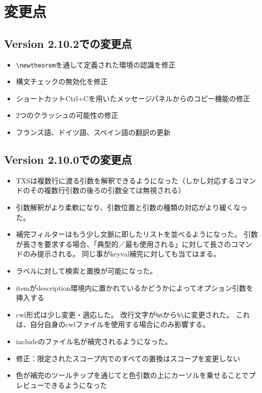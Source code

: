 \chapter{変更点}

\section{Version 2.10.2での変更点}

\begin{itemize}
    \item
      \verb+\newtheorem+を通して定義された環境の認識を修正
    \item
      構文チェックの無効化を修正
    \item
      ショートカットCtrl+Cを用いたメッセージパネルからのコピー機能の修正
    \item
      2つのクラッシュの可能性の修正
    \item
      フランス語、ドイツ語、スペイン語の翻訳の更新
\end{itemize}

\section{Version 2.10.0での変更点}

\begin{itemize}
    \item
      TXSは複数行に渡る引数を解釈できるようになった（しかし対応するコマンドのその複数行引数の後ろの引数全ては無視される）
    \item
      引数解釈がより柔軟になり、引数位置と引数の種類の対応がより緩くなった。
    \item
      補完フィルターはもう少し文脈に即したリストを並べるようになった。
      引数が長さを要求する場合、「典型的／最も使用される」に対して長さのコマンドのみ提示される。
      同じ事がkeyval補完に対しても当てはまる。
    \item
      ラベルに対して検索と置換が可能になった。
    \item
      itemがdescription環境内に置かれているかどうかによってオプション引数を挿入する
    \item
      cwl形式は少し変更・適応した。 改行文字が\verb+%n+から\verb+%\+に変更された。
      これは、自分自身のcwlファイルを使用する場合にのみ影響する。
    \item
      includeのファイル名が補完されるようになった。
    \item
      修正：限定されたスコープ内でのすべての置換はスコープを変更しない
    \item
      色が補完のツールチップを通じてと色引数の上にカーソルを乗せることでプレビューできるようになった
\end{itemize}

